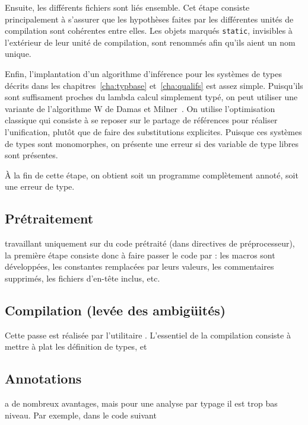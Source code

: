 Ensuite, les différents fichiers sont liés ensemble. Cet étape consiste
principalement à s'assurer que les hypothèses faites par les différentes unités
de compilation sont cohérentes entre elles. Les objets marqués \texttt{static},
invisibles à l'extérieur de leur unité de compilation, sont renommés afin qu'ils
aient un nom unique.

Enfin, l'implantation d'un algorithme d'inférence pour les systèmes de types
décrits dans les chapitres~\ref{cha:typbase} et~\ref{cha:qualifs} est assez
simple. Puisqu'ils sont suffisament proches du lambda calcul simplement typé, on
peut utiliser une variante de l'algorithme W de Damas et
Milner~\cite{DamasMilner}. On utilise l'optimisation classique qui consiste à se
reposer sur le partage de références pour réaliser l'unification, plutôt que de
faire des substitutions explicites. Puisque ces systèmes de types sont
monomorphes, on présente une erreur si des variable de type libres sont
présentes.

À la fin de cette étape, on obtient soit un programme complètement annoté, soit
une erreur de type.

\subsection{Prétraitement}

\ctonewspeak{} travaillant uniquement sur du code prétraité (dans directives de
préprocesseur), la première étape consiste donc à faire passer le code par \cpp:
les macros sont développées, les constantes remplacées par leurs valeurs, les
commentaires supprimés, les fichiers d'en-tête inclus, etc.

\subsection{Compilation (levée des ambigüités)}

Cette passe est réalisée par l'utilitaire \ctonewspeak{}. L'essentiel de la
compilation consiste à mettre à plat les définition de types, et \subsection{Annotations}

\newspeak{} a de nombreux avantages, mais pour une analyse par typage il est
trop bas niveau. Par exemple, dans le code suivant



\wip{}

